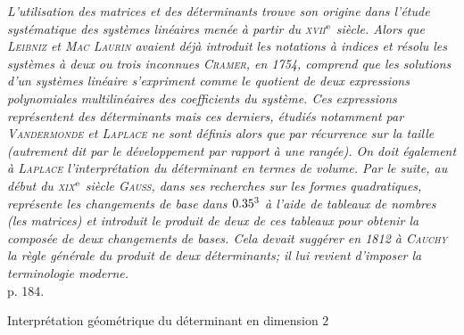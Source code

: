 \textsl{L'utilisation des matrices et des déterminants trouve son origine dans l'étude systématique des systèmes linéaires menée à partir du \textsc{xvii}$^{\mathrm{e}}$ siècle. Alors que \textsc{Leibniz} et \textsc{Mac Laurin} avaient déjà introduit les notations à indices et résolu les systèmes à deux ou trois inconnues \textsc{Cramer}, en 1754, comprend que les solutions d'un systèmes linéaire s'expriment comme le quotient de deux expressions polynomiales multilinéaires des coefficients du système. Ces expressions représentent des déterminants mais ces derniers, étudiés notamment par \textsc{Vandermonde} et \textsc{Laplace} ne sont définis alors que par récurrence sur la taille (autrement dit par le développement par rapport à une rangée). On doit également à \textsc{Laplace} l'interprétation du déterminant en termes de volume. Par le suite, au début du \textsc{xix}$^{\mathrm{e}}$ siècle \textsc{Gauss}, dans ses recherches sur les formes quadratiques, représente les changements de base dans $0.35^3$ à l'aide de tableaux de nombres (les matrices) et introduit le produit de deux de ces tableaux pour obtenir la composée de deux changements de bases. Cela devait suggérer en 1812 à \textsc{Cauchy} la règle générale du produit de deux déterminants; il lui revient d'imposer la terminologie moderne.} \\

\cite{objectif_agregation} p. 184.

\begin{marginfigure}[-7.6cm]
    \caption*{\centering Interprétation géométrique du déterminant en dimension $2$}
   
\end{marginfigure}

